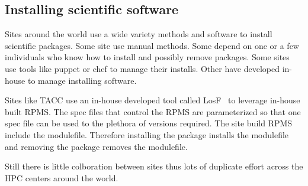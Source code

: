%
%


\subsection{Installing scientific software}

Sites around the world use a wide variety methods and software to
install scientific packages.  Some site use manual methods.  Some
depend on one or a few individuals who know how to install
and possibly remove packages.  Some sites use tools like puppet or
chef to manage their installs.  Other have developed in-house to
manage installing software.

Sites like TACC use an in-house developed tool called
LosF~\cite{lmodSC11} to leverage in-house  built RPMS.  The spec files
that control the RPMS are parameterized so that one spec file can be
used to the plethora of versions required.  The site build RPMS
include the modulefile.  Therefore installing the package installs the
modulefile and removing the package removes the modulefile.

Still there is little colboration between sites thus
lots of duplicate effort across the HPC centers around the world.



